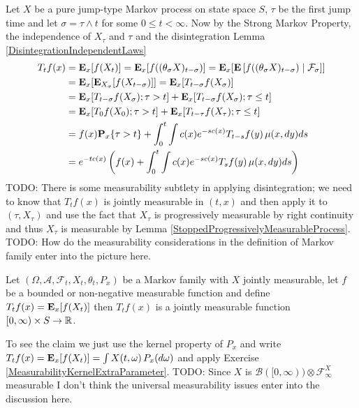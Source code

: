 Let $X$ be a pure jump-type Markov process on state space $S$, $\tau$
be the first jump time and let $\sigma = \tau \wedge t$ for some $0
\leq t < \infty$.  Now by the Strong Markov Property, the independence
of $X_\tau$ and $\tau$ and the disintegration Lemma \ref{DisintegrationIndependentLaws}
\begin{align*}
T_tf(x) 
&=\sexpectation{f(X_t)}{x} 
=\sexpectation{f((\theta_\sigma X)_{t - \sigma})}{x} 
=\sexpectation{\cexpectationlong{\mathcal{F}_\sigma}{f((\theta_\sigma  X)_{t - \sigma})}}{x} \\
&=\sexpectation{\sexpectation{f(X_{t - \sigma})}{X_\sigma}}{x} 
=\sexpectation{T_{t - \sigma}f(X_\sigma)}{x} \\
&=\sexpectation{T_{t - \sigma}f(X_\sigma) ; \tau > t}{x} +
  \sexpectation{T_{t - \sigma}f(X_\sigma); \tau \leq t}{x} \\
&= \sexpectation{T_{0}f(X_0) ; \tau > t}{x}  +
  \sexpectation{T_{t - \tau}f(X_\tau); \tau \leq t}{x} \\
&=f(x) \sprobability{\tau > t}{x} +  \int_0^t \int c(x) e^{-sc(x)} T_{t - s}f(y) \,  \mu(x, dy) ds \\
&=e^{-tc(x)}   \left( f(x) +  \int_0^t \int c(x) e^{-sc(x)} T_{s}f(y) \,  \mu(x, dy) ds \right )\\
\end{align*}
TODO: There is some measurability subtlety in applying disintegration; we need to know that $T_tf(x)$ is jointly measurable in $(t,x)$
and then apply it to $(\tau, X_\tau)$ and use the fact that $X_\tau$ is progressively measurable by right continuity and thus $X_\tau$ is measurable
by Lemma \ref{StoppedProgressivelyMeasurableProcess}.  TODO: How do the measurability considerations in the definition of Markov family enter into the picture here.

\begin{clm}Let $(\Omega, \mathcal{A}, \mathcal{F}_t, X_t, \theta_t, P_x)$ be a Markov family with $X$ jointly measurable, let $f$ be a bounded or non-negative measurable function and define $T_tf(x) = \sexpectation{f(X_t)}{x}$ then $T_tf(x)$ is a jointly measurable function $[0,\infty) \times S \to \reals$.
\end{clm}
To see the claim we just use the kernel property of $P_x$ and write $T_tf(x) = \sexpectation{f(X_t)}{x} = \int X(t, \omega) \, P_x(d\omega)$ and apply Exercise \ref{MeasurabilityKernelExtraParameter}.  TODO:  Since $X$ is $\mathcal{B}([0,\infty)) \otimes \mathcal{F}^X_\infty$ measurable I don't think the universal measurability issues enter into the discussion here.


